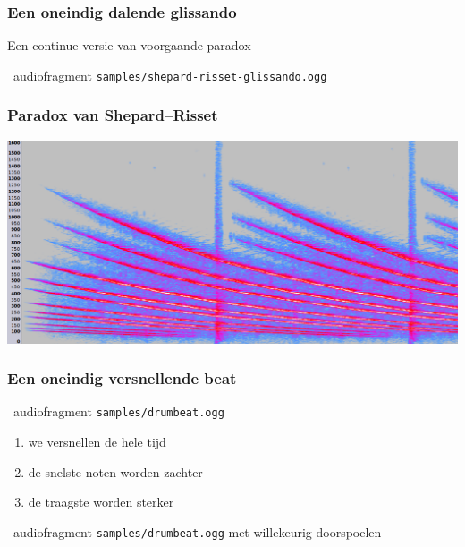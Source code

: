 \documentclass[compress, darktitle, framenumber, handout, totalframenumber]{beamer}
\begin{document}
\begin{frame}
  \frametitle{Een oneindig dalende glissando}

  Een continue versie van voorgaande paradox
  \begin{block}{\twonotes\ audiofragment}
    \texttt{samples/shepard-risset-glissando.ogg}
  \end{block}
\end{frame}

\begin{frame}
  \frametitle{Paradox van Shepard--Risset}

  \includegraphics[width=\textwidth]{images/glissando-spectrum.png}
\end{frame}

\begin{frame}
  \frametitle{Een oneindig versnellende beat}

  \begin{block}{\twonotes\ audiofragment}
    \texttt{samples/drumbeat.ogg}
  \end{block}

  \begin{enumerate}
    \item we versnellen de hele tijd
    \item de snelste noten worden zachter
    \item de traagste worden sterker
  \end{enumerate}
  \pause
  \begin{block}{\twonotes\ audiofragment}
    \texttt{samples/drumbeat.ogg} met willekeurig doorspoelen
  \end{block}
\end{frame}
\end{document}
